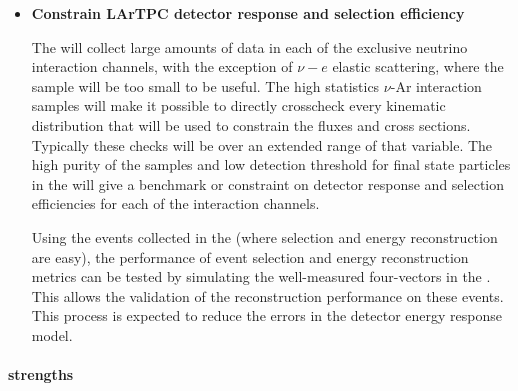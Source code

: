 \begin{itemize}
\item{{\bf Constrain LArTPC detector response and selection efficiency} 
    
The  will collect large amounts of data in each of the exclusive neutrino interaction channels, with the exception of $\nu-e$ elastic scattering, where the  sample will be too small to be useful. The high statistics $\nu$-Ar interaction samples will make it possible to directly crosscheck every kinematic distribution that will be used to constrain the fluxes and cross sections.  Typically these checks will be over an extended range of that variable.  The high purity of the  samples and low detection threshold for final state particles in the  will give a benchmark or constraint on  detector response and selection efficiencies for each of the interaction channels.

Using the events collected in the  (where selection and energy reconstruction are easy), the performance of   event selection and energy reconstruction metrics can be tested by simulating the well-measured  four-vectors in the .  This allows the validation of the  reconstruction performance on these events. This process is expected to reduce the  errors in the  detector energy response model.

    
}
    

\end{itemize}   
\paragraph{ strengths}

